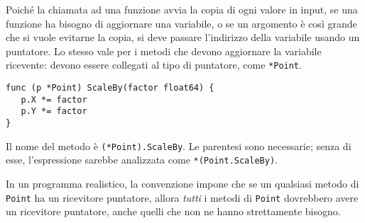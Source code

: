 Poiché la chiamata ad una funzione avvia la copia di ogni valore in input, se una funzione ha bisogno di aggiornare una variabile, o se un argomento è così grande che si vuole evitarne la copia, si deve passare l'indirizzo della variabile usando un puntatore.
Lo stesso vale per i metodi che devono aggiornare la variabile ricevente: devono essere collegati al tipo di puntatore, come \verb|*Point|.
\begin{lstlisting}[frame=single, label={lst:lstlisting5-2.1}]
func (p *Point) ScaleBy(factor float64) {
   p.X *= factor
   p.Y *= factor
}
\end{lstlisting}
Il nome del metodo è \verb|(*Point).ScaleBy|.
Le parentesi sono necessarie;
senza di esse, l'espressione sarebbe analizzata come \verb|*(Point.ScaleBy)|.

In un programma realistico, la convenzione impone che se un qualsiasi metodo di \verb|Point| ha un ricevitore puntatore, allora \textit{tutti} i metodi di \verb|Point| dovrebbero avere un ricevitore puntatore, anche quelli che non ne hanno strettamente bisogno.

